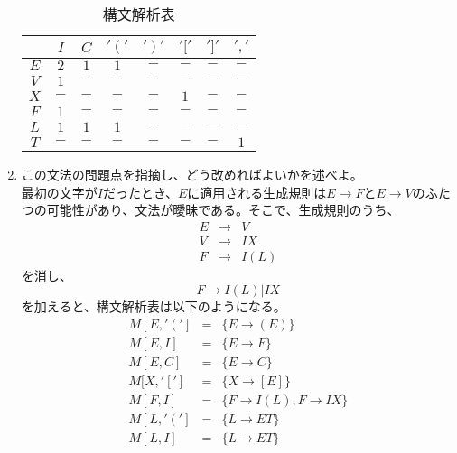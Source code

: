 \documentclass[a4paper,12pt]{jarticle}
\begin{document}
\begin{enumerate}
\begin{table}[H]
 \begin{center}
  \caption{構文解析表}
  \begin{tabular}{|c|ccccccc|}\hline
   \backslashbox{}{}&	$ I $&	$ C $&	$' \left( \right. '$&	$' \left. \right) '$&	$ ' [ ' $&	$ ' ] ' $&	$ ' , ' $\\	\hline
   $ E $&		$ 2 $&	$ 1 $&	$ 1 $&			$ - $&			$ - $&		$ - $&		$ - $\\
   $ V $&		$ 1 $&	$ - $&	$ - $&			$ - $&			$ - $&		$ - $&		$ - $\\
   $ X $&		$ - $&	$ - $&	$ - $&			$ - $&			$ 1 $&		$ - $&		$ - $\\
   $ F $&		$ 1 $&	$ - $&	$ - $&			$ - $&			$ - $&		$ - $&		$ - $\\
   $ L $&		$ 1 $&	$ 1 $&	$ 1 $&			$ - $&			$ - $&		$ - $&		$ - $\\
   $ T $&		$ - $&	$ - $&	$ - $&			$ - $&			$ - $&		$ - $&		$ 1 $\\		\hline
  \end{tabular}
 \end{center}
\end{table}
\item この文法の問題点を指摘し、どう改めればよいかを述べよ。\\
最初の文字が$ I $だったとき、$ E $に適用される生成規則は$ E \rightarrow F $と$ E \rightarrow V $のふたつの可能性があり、文法が曖昧である。そこで、生成規則のうち、
\begin{eqnarray*}
E & \rightarrow & V \\
V & \rightarrow & I X \\
F & \rightarrow & I \left( L \right)
\end{eqnarray*}
を消し、
\begin{equation}
F \rightarrow I \left( L \right) | I X
\end{equation}
を加えると、構文解析表は以下のようになる。
\begin{eqnarray*}
M [ E , ' \left( \right. ' ] & = & \{ E \rightarrow \left( E \right) \} \\
M [ E , I ] & = & \{ E \rightarrow F \} \\
M [ E , C ] & = & \{ E \rightarrow C \} \\
M [ X , ' [ ' ] & = & \{ X \rightarrow [ E ] \} \\
M [ F , I ] & = & \{ F \rightarrow I \left( L \right) , F \rightarrow I X \} \\
M [ L , ' \left( \right. ' ] & = & \{ L \rightarrow E T \} \\
M [ L , I ] & = & \{ L \rightarrow E T \} \\

\end{eqnarray*}
\end{enumerate}
\end{document}
